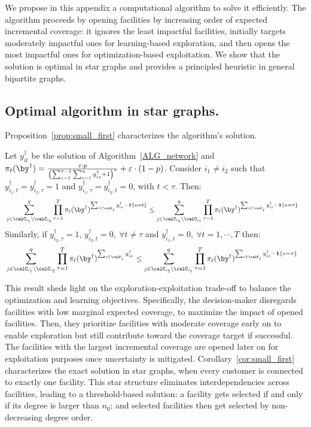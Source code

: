 \documentclass[blindrev]{informs3noheader}
\begin{document}
We propose in this appendix a computational algorithm to solve it efficiently. The algorithm proceeds by opening facilities by increasing order of expected incremental coverage: it ignores the least impactful facilities, initially targets moderately impactful ones for learning-based exploration, and then opens the most impactful ones for optimization-based exploitation. We show that the solution is optimal in star graphs and provides a principled heuristic in general bipartite graphs.

\subsection{Optimal algorithm in star graphs.}

Proposition~\ref{prop:small_first} characterizes the algorithm's solution.

\begin{proposition}\label{prop:small_first}
Let $y^\dagger_{it}$ be the solution of Algorithm~\ref{ALG_network} and $\pi_t(\by^\dagger)=\frac{\varepsilon\cdot p}{\left(\sum_{s=1}^{\tau-1} \sum_{i=1}^n y^\dagger_{is} +1\right)^r}+\varepsilon\cdot(1-p)$. Consider $i_1\neq i_2$ such that $y^\dagger_{i_1,t}=y^\dagger_{i_2, \tau}=1$ and $y^\dagger_{i_1,\tau}=y^\dagger_{i_2, t}=0$, with $t<\tau$. Then:
\begin{align*}
    &\sum_{j \in \calC_{i_1} \setminus \calC_{i_2}}^q \prod_{\tau=1}^T \pi_t(\by^\dagger)^{\sum_{i \in \calF_j} y^\dagger_{iv}-\mathbf{1}\{v=t\}}
\leq \sum_{j \in \calC_{i_2} \setminus \calC_{i_1}}^q \prod_{\tau=1}^T \pi_t(\by^\dagger)^{\sum_{i \in \calF_j} y^\dagger_{iv}-\mathbf{1}\{v=\tau\}}
\end{align*}
Similarly, if $y^\dagger_{i_2,\tau}=1$, $y^\dagger_{i_2,t}=0,\ \forall t\neq\tau$ and $y^\dagger_{i_1,t}=0,\ \forall t=1,\cdots,T$ then:
\begin{align*}
    &\sum_{j \in \calC_{i_1} \setminus \calC_{i_2}}^q \prod_{\tau=1}^T \pi_t(\by^\dagger)^{\sum_{i \in \calF_j} y^\dagger_{iv}}
\leq \sum_{j \in \calC_{i_2} \setminus \calC_{i_1}}^q \prod_{\tau=1}^T \pi_t(\by^\dagger)^{\sum_{i \in \calF_j} y^\dagger_{iv}-\mathbf{1}\{v=\tau\}}
\end{align*}
\end{proposition}

This result sheds light on the exploration-exploitation trade-off to balance the optimization and learning objectives. Specifically, the decision-maker disregards facilities with low marginal expected coverage, to maximize the impact of opened facilities. Then, they prioritize facilities with moderate coverage early on to enable exploration but still contribute toward the coverage target if successful. The facilities with the largest incremental coverage are opened later on for exploitation purposes once uncertainty is mitigated. Corollary~\ref{cor:small_first} characterizes the exact solution in star graphs, when every customer is connected to exactly one facility. This star structure eliminates interdependencies across facilities, leading to a threshold-based solution: a facility gets selected if and only if its degree is larger than $n_0$; and selected facilities then get selected by non-decreasing degree order.
\end{document}
